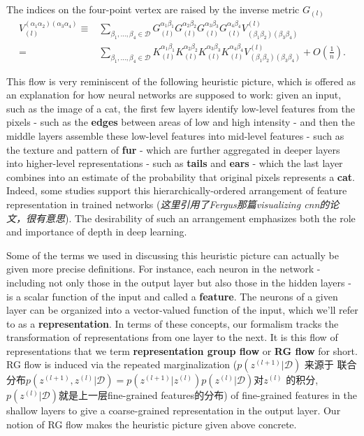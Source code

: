 The indices on the four-point vertex are raised by the inverse metric $G_{(l)}$
\begin{equation}
    \begin{aligned}
    V_{(l)}^{(\alpha_1\alpha_2)(\alpha_3\alpha_4)} \equiv & \sum_{\beta_1,...,\beta_4\in 
    \mathcal{D}} G_{(l)}^{\alpha_1\beta_1}G_{(l)}^{\alpha_2\beta_2}
    G_{(l)}^{\alpha_3\beta_3}G_{(l)}^{\alpha_4\beta_4}
    V_{(\beta_1\beta_2)(\beta_3\beta_4)}^{(l)} \\
    =& \sum_{\beta_1,...,\beta_4\in 
    \mathcal{D}} K_{(l)}^{\alpha_1\beta_1}K_{(l)}^{\alpha_2\beta_2}
    K_{(l)}^{\alpha_3\beta_3}K_{(l)}^{\alpha_4\beta_4}
    V_{(\beta_1\beta_2)(\beta_3\beta_4)}^{(l)} + O\left(\frac{1}{n}\right).
    \end{aligned}
\end{equation}

This flow is very reminiscent of the following heuristic picture, which is 
offered as an explanation for how neural networks are supposed to work: 
given an input, such as the image of a cat, the first few layers identify 
low-level features from the pixels - such as the \textbf{edges} between areas of low 
and high intensity - and then the middle layers assemble these low-level 
features into mid-level features - such as the texture and pattern of \textbf{fur} - 
which are further aggregated in deeper layers into higher-level representations 
- such as \textbf{tails} and \textbf{ears} - which the last layer combines into 
an estimate of the probability that original pixels represents a \textbf{cat}.
Indeed, some studies support this hierarchically-ordered arrangement of feature 
representation in trained networks (\emph{这里引用了Fergus那篇visualizing cnn的论文，很有意思}). 
The desirability of such an arrangement emphasizes both the role and importance 
of depth in deep learning.

Some of the terms we used in discussing this heuristic picture can actually be 
given more precise definitions. For instance, each neuron in the network - 
including not only those in the output layer but also those in the hidden layers - 
is a scalar function of the input and called a \textbf{feature}. The neurons of a given layer 
can be organized into a vector-valued function of the input, which we'll refer to as 
a \textbf{representation}. In terms of these concepts, our formalism tracks the 
transformation of representations from one layer to the next. It is this flow of 
representations that we term \textbf{representation group flow} or \textbf{RG flow} 
for short. RG flow is induced via the repeated 
marginalization ($p\left(z^{(l+1)}\big| \mathcal{D}\right)$ 来源于
联合分布$p\left(z^{(l+1)},z^{(l)}\big| \mathcal{D}\right) = 
p\left(z^{(l+1)}\big| z^{(l)}\right)p\left(z^{(l)}\big| \mathcal{D}\right)$对$z^{(l)}$
的积分, $p\left(z^{(l)}\big| \mathcal{D}\right)$就是上一层fine-grained features的分布)
of fine-grained features in the shallow layers to give a coarse-grained 
representation in the output layer. Our notion of RG flow makes the heuristic picture 
given above concrete.

